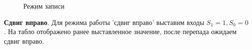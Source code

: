 \begin{figure}[H]
    \centering
    \hspace{40mm}
    \caption{Режим записи}
\end{figure}
\newpage

\textbf{Сдвиг вправо}. Для режима работы 'сдвиг вправо' выставим входы $S_1=1,S_0=0$. На табло отображено
ранее выставленное значение, после перепада ожидаем сдвиг вправо.

